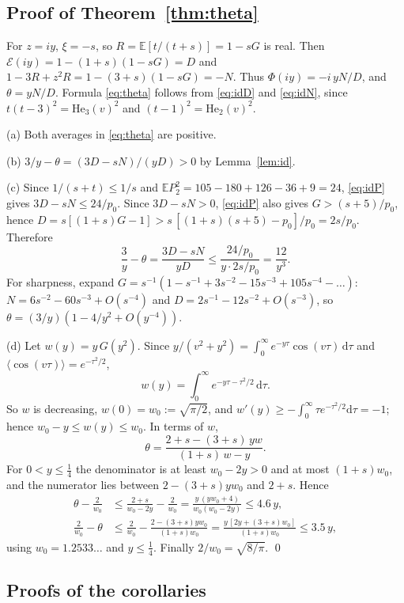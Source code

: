 \documentclass[11pt]{article}
\newcommand{\dd}{\mathrm{d}}
\newcommand{\E}{\mathbb{E}}
\newcommand{\He}{\mathrm{He}}
\newcommand{\avg}[1]{\langle #1\rangle}
\theoremstyle{remark}
\begin{document}
\subsection{Proof of Theorem~\ref{thm:theta}}

For $z = iy$, $\xi = -s$, so $R = \E[t/(t+s)] = 1-sG$ is real. Then
$\mathcal{E}(iy) = 1-(1+s)(1-sG) = D$ and
$1 - 3R + z^2R = 1-(3+s)(1-sG) = -N$. Thus
$\Phi(iy) = -i\,yN/D$, and $\theta = yN/D$. Formula \eqref{eq:theta} follows
from \eqref{eq:idD} and \eqref{eq:idN}, since $t(t-3)^2 = \He_3(v)^2$ and
$(t-1)^2 = \He_2(v)^2$.

(a) Both averages in \eqref{eq:theta} are positive.

(b) $3/y - \theta = (3D-sN)/(yD) > 0$ by Lemma~\ref{lem:id}.

(c) Since $1/(s+t)\le1/s$ and
$\E P_2^2 = 105-180+126-36+9 = 24$, \eqref{eq:idP} gives
$3D-sN\le24/p_0$. Since $3D-sN>0$, \eqref{eq:idP} also gives
$G > (s+5)/p_0$, hence
$D = s[(1+s)G-1] > s\,[(1+s)(s+5)-p_0]/p_0 = 2s/p_0$. Therefore
\[
  \frac3y - \theta = \frac{3D-sN}{yD} \le \frac{24/p_0}{y\cdot2s/p_0}
  = \frac{12}{y^3}.
\]
For sharpness, expand $G = s^{-1}(1 - s^{-1} + 3s^{-2} - 15s^{-3} + 105s^{-4} - \dots)$:
$N = 6s^{-2} - 60s^{-3} + O(s^{-4})$ and $D = 2s^{-1} - 12s^{-2} + O(s^{-3})$,
so $\theta = (3/y)(1 - 4/y^2 + O(y^{-4}))$.

(d) Let $w(y) = y\,G(y^2)$. Since
$y/(v^2+y^2) = \int_0^\infty e^{-y\tau}\cos(v\tau)\,\dd\tau$ and
$\avg{\cos(v\tau)} = e^{-\tau^2/2}$,
\[
  w(y) = \int_0^\infty e^{-y\tau-\tau^2/2}\,\dd\tau .
\]
So $w$ is decreasing, $w(0) = w_0 := \sqrt{\pi/2}$, and
$w'(y)\ge-\int_0^\infty\tau e^{-\tau^2/2}\dd\tau = -1$; hence
$w_0 - y\le w(y)\le w_0$. In terms of $w$,
\[
  \theta = \frac{2+s-(3+s)\,yw}{(1+s)\,w - y} .
\]
For $0<y\le\tfrac14$ the denominator is at least $w_0-2y>0$ and at most
$(1+s)w_0$, and the numerator lies between $2-(3+s)yw_0$ and $2+s$. Hence
\begin{align*}
  \theta - \frac{2}{w_0} &\le \frac{2+s}{w_0-2y} - \frac{2}{w_0}
    = \frac{y\,(yw_0+4)}{w_0(w_0-2y)} \le 4.6\,y,\\
  \frac{2}{w_0} - \theta &\le \frac{2}{w_0} - \frac{2-(3+s)yw_0}{(1+s)w_0}
    = \frac{y\,[2y+(3+s)w_0]}{(1+s)w_0} \le 3.5\,y ,
\end{align*}
using $w_0 = 1.2533\ldots$ and $y\le\tfrac14$. Finally
$2/w_0 = \sqrt{8/\pi}$. \qed

\subsection{Proofs of the corollaries}
\end{document}
